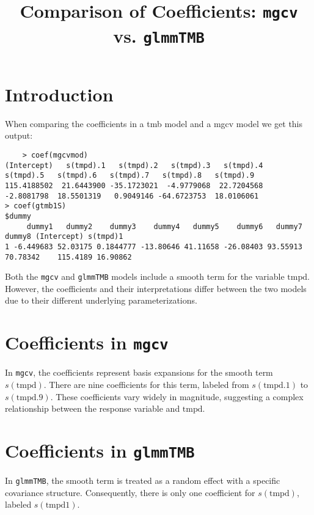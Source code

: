 \documentclass{article}
\begin{document}
\title{Comparison of Coefficients: \texttt{mgcv} vs. \texttt{glmmTMB}}
\maketitle

\section{Introduction}

When comparing the coefficients in a tmb model and a mgcv model we get this output:
\begin{verbatim}
    > coef(mgcvmod)
(Intercept)   s(tmpd).1   s(tmpd).2   s(tmpd).3   s(tmpd).4   s(tmpd).5   s(tmpd).6   s(tmpd).7   s(tmpd).8   s(tmpd).9 
115.4188502  21.6443900 -35.1723021  -4.9779068  22.7204568  -2.8081798  18.5501319   0.9049146 -64.6723753  18.0106061 
> coef(gtmb1S)
$dummy
     dummy1   dummy2    dummy3    dummy4   dummy5    dummy6   dummy7   dummy8 (Intercept) s(tmpd)1
1 -6.449683 52.03175 0.1844777 -13.80646 41.11658 -26.08403 93.55913 70.78342    115.4189 16.90862
\end{verbatim}

Both the \texttt{mgcv} and \texttt{glmmTMB} models include a smooth term for the variable \( \text{tmpd} \). However, the coefficients and their interpretations differ between the two models due to their different underlying parameterizations. 

\section{Coefficients in \texttt{mgcv}}

In \texttt{mgcv}, the coefficients represent basis expansions for the smooth term \( s(\text{tmpd}) \). There are nine coefficients for this term, labeled from \( s(\text{tmpd}.1) \) to \( s(\text{tmpd}.9) \). These coefficients vary widely in magnitude, suggesting a complex relationship between the response variable and \( \text{tmpd} \).

\section{Coefficients in \texttt{glmmTMB }}

In \texttt{glmmTMB}, the smooth term is treated as a random effect with a specific covariance structure. Consequently, there is only one coefficient for \( s(\text{tmpd}) \), labeled \( s(\text{tmpd}1) \).
\end{document}
